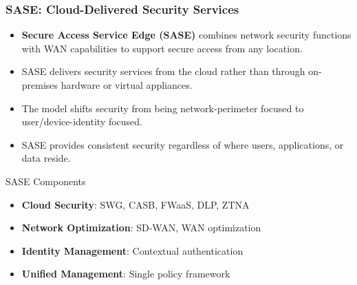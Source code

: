 \documentclass{beamer}
\begin{document}
\begin{frame}
    \frametitle{SASE: Cloud-Delivered Security Services}
    \begin{itemize}
        \item \textbf{Secure Access Service Edge (SASE)} combines network security functions with WAN capabilities to support secure access from any location.
        \item SASE delivers security services from the cloud rather than through on-premises hardware or virtual appliances.
        \item The model shifts security from being network-perimeter focused to user/device-identity focused.
        \item SASE provides consistent security regardless of where users, applications, or data reside.
    \end{itemize}
    
    \begin{block}{SASE Components}
        \begin{itemize}
            \item \textbf{Cloud Security}: SWG, CASB, FWaaS, DLP, ZTNA
            \item \textbf{Network Optimization}: SD-WAN, WAN optimization
            \item \textbf{Identity Management}: Contextual authentication
            \item \textbf{Unified Management}: Single policy framework
        \end{itemize}
    \end{block}
\end{frame}
\end{document}
